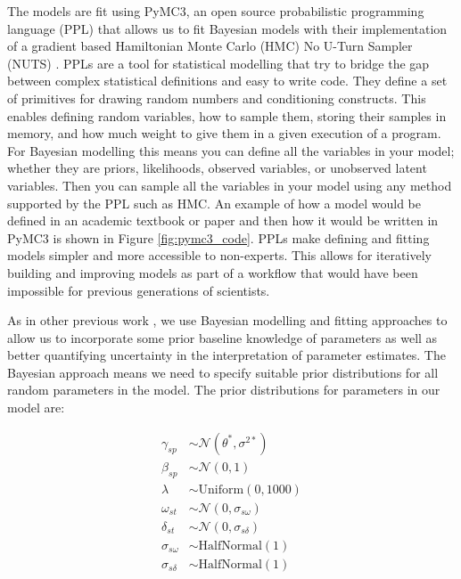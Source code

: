 The models are fit using PyMC3, an open source probabilistic programming language (PPL) that allows us to fit Bayesian models with their implementation of a gradient based Hamiltonian Monte Carlo (HMC) No U-Turn Sampler (NUTS) \cite{pymc3}. PPLs are a tool for statistical modelling that try to bridge the gap between complex statistical definitions and easy to write code. They define a set of primitives for drawing random numbers and conditioning constructs. This enables defining random variables, how to sample them, storing their samples in memory, and how much weight to give them in a given execution of a program. For Bayesian modelling this means you can define all the variables in your model; whether they are priors, likelihoods, observed variables, or unobserved latent variables. Then you can sample all the variables in your model using any method supported by the PPL such as HMC. An example of how a model would be defined in an academic textbook or paper and then how it would be written in PyMC3 is shown in Figure \ref{fig:pymc3_code}. PPLs make defining and fitting models simpler and more accessible to non-experts. This allows for iteratively building and improving models as part of a workflow that would have been impossible for previous generations of scientists.

As in other previous work \cite{Baio2010} \cite{Benz2020}, we use Bayesian modelling and fitting approaches to allow us to incorporate some prior baseline knowledge of parameters as well as better quantifying uncertainty in the interpretation of parameter estimates. The Bayesian approach means we need to specify suitable prior distributions for all random parameters in the model. The prior distributions for parameters in our model are:

\begin{equation} \label{eq:priors}
\begin{split}
\gamma_{sp} &\sim \mathcal{N}(\theta^*, \sigma^{2*}) \\
\beta_{sp} &\sim \mathcal{N}(0, 1) \\
\lambda &\sim \text{Uniform}(0, 1000) \\
\omega_{st} &\sim \mathcal{N}(0, \sigma_{s\omega}) \\
\delta_{st} &\sim \mathcal{N}(0, \sigma_{s\delta}) \\
\sigma_{s\omega} &\sim \text{HalfNormal}(1) \\
\sigma_{s\delta} &\sim \text{HalfNormal}(1)
\end{split}
\end{equation}


